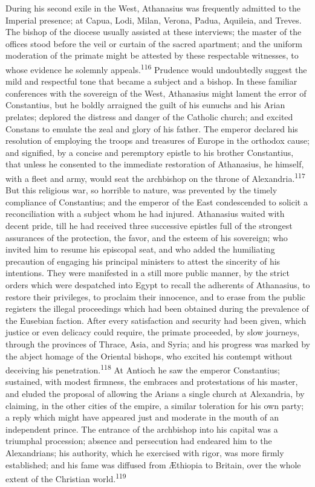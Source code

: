 During his second exile in the West, Athanasius was frequently
admitted to the Imperial presence; at Capua, Lodi, Milan, Verona,
Padua, Aquileia, and Treves. The bishop of the diocese usually
assisted at these interviews; the master of the offices stood
before the veil or curtain of the sacred apartment; and the
uniform moderation of the primate might be attested by these
respectable witnesses, to whose evidence he solemnly appeals.\textsuperscript{116}
Prudence would undoubtedly suggest the mild and respectful tone
that became a subject and a bishop. In these familiar conferences
with the sovereign of the West, Athanasius might lament the error
of Constantius, but he boldly arraigned the guilt of his eunuchs
and his Arian prelates; deplored the distress and danger of the
Catholic church; and excited Constans to emulate the zeal and
glory of his father. The emperor declared his resolution of
employing the troops and treasures of Europe in the orthodox
cause; and signified, by a concise and peremptory epistle to his
brother Constantius, that unless he consented to the immediate
restoration of Athanasius, he himself, with a fleet and army,
would seat the archbishop on the throne of Alexandria.\textsuperscript{117} But
this religious war, so horrible to nature, was prevented by the
timely compliance of Constantius; and the emperor of the East
condescended to solicit a reconciliation with a subject whom he
had injured. Athanasius waited with decent pride, till he had
received three successive epistles full of the strongest
assurances of the protection, the favor, and the esteem of his
sovereign; who invited him to resume his episcopal seat, and who
added the humiliating precaution of engaging his principal
ministers to attest the sincerity of his intentions. They were
manifested in a still more public manner, by the strict orders
which were despatched into Egypt to recall the adherents of
Athanasius, to restore their privileges, to proclaim their
innocence, and to erase from the public registers the illegal
proceedings which had been obtained during the prevalence of the
Eusebian faction. After every satisfaction and security had been
given, which justice or even delicacy could require, the primate
proceeded, by slow journeys, through the provinces of Thrace,
Asia, and Syria; and his progress was marked by the abject homage
of the Oriental bishops, who excited his contempt without
deceiving his penetration.\textsuperscript{118} At Antioch he saw the emperor
Constantius; sustained, with modest firmness, the embraces and
protestations of his master, and eluded the proposal of allowing
the Arians a single church at Alexandria, by claiming, in the
other cities of the empire, a similar toleration for his own
party; a reply which might have appeared just and moderate in the
mouth of an independent prince. The entrance of the archbishop
into his capital was a triumphal procession; absence and
persecution had endeared him to the Alexandrians; his authority,
which he exercised with rigor, was more firmly established; and
his fame was diffused from Æthiopia to Britain, over the whole
extent of the Christian world.\textsuperscript{119}


